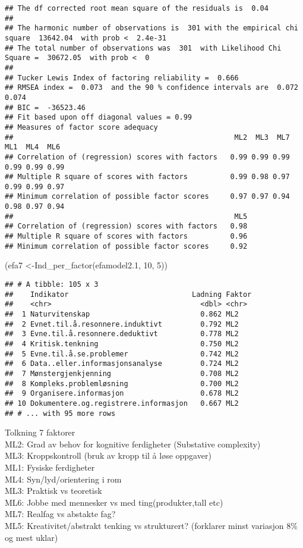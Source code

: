 \documentclass[
]{article}
\newenvironment{Shaded}{\begin{snugshade}}{\end{snugshade}}
\newcommand{\DecValTok}[1]{\textcolor[rgb]{0.00,0.00,0.81}{#1}}
\newcommand{\FloatTok}[1]{\textcolor[rgb]{0.00,0.00,0.81}{#1}}
\newcommand{\FunctionTok}[1]{\textcolor[rgb]{0.00,0.00,0.00}{#1}}
\newcommand{\NormalTok}[1]{#1}
\newcommand{\OtherTok}[1]{\textcolor[rgb]{0.56,0.35,0.01}{#1}}
\begin{document}
\begin{verbatim}
## The df corrected root mean square of the residuals is  0.04 
## 
## The harmonic number of observations is  301 with the empirical chi square  13642.04  with prob <  2.4e-31 
## The total number of observations was  301  with Likelihood Chi Square =  30672.05  with prob <  0 
## 
## Tucker Lewis Index of factoring reliability =  0.666
## RMSEA index =  0.073  and the 90 % confidence intervals are  0.072 0.074
## BIC =  -36523.46
## Fit based upon off diagonal values = 0.99
## Measures of factor score adequacy             
##                                                    ML2  ML3  ML7  ML1  ML4  ML6
## Correlation of (regression) scores with factors   0.99 0.99 0.99 0.99 0.99 0.99
## Multiple R square of scores with factors          0.99 0.98 0.97 0.99 0.99 0.97
## Minimum correlation of possible factor scores     0.97 0.97 0.94 0.98 0.97 0.94
##                                                    ML5
## Correlation of (regression) scores with factors   0.98
## Multiple R square of scores with factors          0.96
## Minimum correlation of possible factor scores     0.92
\end{verbatim}

\begin{Shaded}
\begin{Highlighting}[]
\NormalTok{(efa7 }\OtherTok{\textless{}{-}}\FunctionTok{Ind\_per\_factor}\NormalTok{(efamodel2}\FloatTok{.1}\NormalTok{, }\DecValTok{10}\NormalTok{, }\DecValTok{5}\NormalTok{))}
\end{Highlighting}
\end{Shaded}

\begin{verbatim}
## # A tibble: 105 x 3
##    Indikator                             Ladning Faktor
##    <chr>                                   <dbl> <chr> 
##  1 Naturvitenskap                          0.862 ML2   
##  2 Evnet.til.å.resonnere.induktivt         0.792 ML2   
##  3 Evne.til.å.resonnere.deduktivt          0.778 ML2   
##  4 Kritisk.tenkning                        0.750 ML2   
##  5 Evne.til.å.se.problemer                 0.742 ML2   
##  6 Data..eller.informasjonsanalyse         0.724 ML2   
##  7 Mønstergjenkjenning                     0.708 ML2   
##  8 Kompleks.problemløsning                 0.700 ML2   
##  9 Organisere.informasjon                  0.678 ML2   
## 10 Dokumentere.og.registrere.informasjon   0.667 ML2   
## # ... with 95 more rows
\end{verbatim}

Tolkning 7 faktorer\\
ML2: Grad av behov for kognitive ferdigheter (Substative complexity)\\
ML3: Kroppskontroll (bruk av kropp til å løse oppgaver)\\
ML1: Fysiske ferdigheter\\
ML4: Syn/lyd/orientering i rom\\
ML3: Praktisk vs teoretisk\\
ML6: Jobbe med mennesker vs med ting(produkter,tall etc)\\
ML7: Realfag vs abstakte fag?\\
ML5: Kreativitet/abstrakt tenking vs strukturert? (forklarer minst
variasjon 8\% og mest uklar)\\
\end{document}
